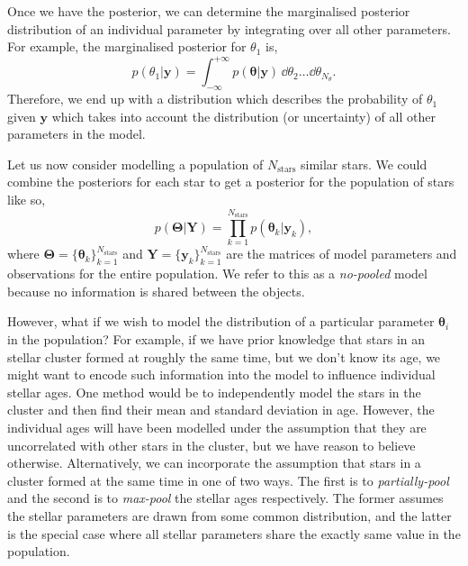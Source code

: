 Once we have the posterior, we can determine the marginalised posterior distribution of an individual parameter by integrating over all other parameters. For example, the marginalised posterior for $\theta_1$ is,
%
\begin{equation}
    p(\theta_1 | \bm{y}) = \int_{-\infty}^{+\infty} p(\bm{\theta} | \bm{y}) \, \dd \theta_2 \dots \dd \theta_{N_{\theta}}.
\end{equation}
%
Therefore, we end up with a distribution which describes the probability of $\theta_1$ given $\bm{y}$ which takes into account the distribution (or uncertainty) of all other parameters in the model.

Let us now consider modelling a population of $N_\mathrm{stars}$ similar stars. We could combine the posteriors for each star to get a posterior for the population of stars like so,
%
\begin{equation}
    p(\bm{\Theta}|\bm{Y}) = \prod_{k=1}^{N_\mathrm{stars}} p(\bm{\theta}_k|\bm{y}_k),
\end{equation}
%
where $\bm{\Theta} = \{\bm{\theta}_k\}_{k=1}^{N_\mathrm{stars}}$ and $\bm{Y} = \{\bm{y}_k\}_{k=1}^{N_\mathrm{stars}}$ are the matrices of model parameters and observations for the entire population. We refer to this as a \emph{no-pooled} model because no information is shared between the objects. 

However, what if we wish to model the distribution of a particular parameter $\bm{\theta}_i$ in the population? For example, if we have prior knowledge that stars in an stellar cluster formed at roughly the same time, but we don't know its age, we might want to encode such information into the model to influence individual stellar ages. One method would be to independently model the stars in the cluster and then find their mean and standard deviation in age. However, the individual ages will have been modelled under the assumption that they are uncorrelated with other stars in the cluster, but we have reason to believe otherwise. Alternatively, we can incorporate the assumption that stars in a cluster formed at the same time in one of two ways. The first is to \emph{partially-pool} and the second is to \emph{max-pool} the stellar ages respectively. The former assumes the stellar parameters are drawn from some common distribution, and the latter is the special case where all stellar parameters share the exactly same value in the population.

